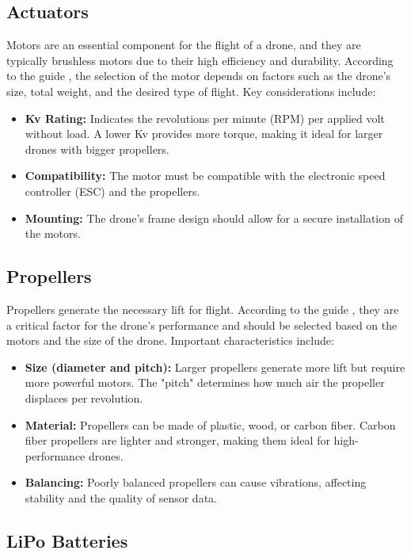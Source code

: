 \subsection{Actuators}

Motors are an essential component for the flight of a drone, and they are typically brushless motors due to their high efficiency and durability. According to the guide \cite{ardupilot}, the selection of the motor depends on factors such as the drone's size, total weight, and the desired type of flight. Key considerations include:

\begin{itemize}
    \item \textbf{Kv Rating:} Indicates the revolutions per minute (RPM) per applied volt without load. A lower Kv provides more torque, making it ideal for larger drones with bigger propellers.
    \item \textbf{Compatibility:} The motor must be compatible with the electronic speed controller (ESC) and the propellers.
    \item \textbf{Mounting:} The drone's frame design should allow for a secure installation of the motors.
\end{itemize}

\subsection{Propellers}

Propellers generate the necessary lift for flight. According to the guide \cite{ardupilot}, they are a critical factor for the drone's performance and should be selected based on the motors and the size of the drone. Important characteristics include:

\begin{itemize}
    \item \textbf{Size (diameter and pitch):} Larger propellers generate more lift but require more powerful motors. The "pitch" determines how much air the propeller displaces per revolution.
    \item \textbf{Material:} Propellers can be made of plastic, wood, or carbon fiber. Carbon fiber propellers are lighter and stronger, making them ideal for high-performance drones.
    \item \textbf{Balancing:} Poorly balanced propellers can cause vibrations, affecting stability and the quality of sensor data.
\end{itemize}

\subsection{LiPo Batteries}

